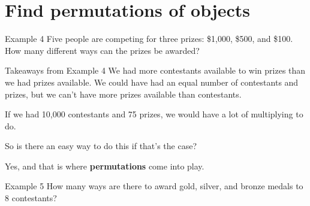 \documentclass[t]{beamer}
\begin{document}
\section{Find permutations of objects}

\begin{frame}{Example 4}
Five people are competing for three prizes: \$1,000, \$500, and \$100. How many different ways can the prizes be awarded?	\newline\\
\begin{center}
\end{center}
\end{frame}

\begin{frame}{Takeaways from Example 4}
We had more contestants available to win prizes than we had prizes available. We could have had an equal number of contestants and prizes, but we can't have more prizes available than contestants. \newline\\	\pause

If we had 10,000 contestants and 75 prizes, we would have a lot of multiplying to do.	\newline\\	\pause

So is there an easy way to do this if that's the case?	\newline\\	\pause

Yes, and that is where {\color{blue}\textbf{permutations}} come into play.
\end{frame}

\begin{frame}{Example 5}
How many ways are there to award gold, silver, and bronze medals to 8 contestants?	\newline\\
\begin{center}
\end{center}
\end{frame}
\end{document}
